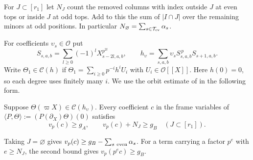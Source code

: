 For $J\subset[r_1]$ let $N_J$ count the removed columns with index
outside $J$ at even tops or inside $J$ at odd tops. Add to this
the sum of $|I\cap J|$ over the remaining minors at odd positions.
In particular $N_\varnothing=\sum_{s\in\mathcal T_{\rm ev}}\alpha_s$.

For coefficients $\upsilon_s\in\mathcal O$ put
\[
 S_{s,a,b}=\sum_{l\ge0}(-1)^l X_{s-2l,a,b}^{p^{2l}},\qquad
 h_\upsilon=\sum_{s,a,b}\upsilon_s S_{s,a,b}^{\,p}S_{s+1,a,b}.
\]
Write $\Theta_1\in\mathcal C(h)$ if
$\Theta_1=\sum_{i\ge0}p^{-i}h^i U_i$ with $U_i\in\mathcal O[[X]]$.
Here $h(0)=0$, so each degree uses finitely many $i$. We use the
orbit estimate of \citep[Theorem~9.6]{adriazola-grh} in the following form.

\begin{theorem}\label{thm:inert-valuation}
Suppose $\Theta(\varpi X)\in\mathcal C(h_\upsilon)$. Every coefficient
$c$ in the frame variables of $\langle P,\Theta\rangle
:=(P(\partial_X)\Theta)(0)$ satisfies
\begin{equation}\label{eq:inert-valuation}
       v_p(c)\ge g_A,\qquad v_p(c)+N_J\ge g_B
       \quad(J\subset[r_1]).
\end{equation}
\end{theorem}

Taking $J=\varnothing$ gives $v_p(c)\ge g_B-\sum_{s\ {\rm even}}\alpha_s$.
For a term carrying a factor $p^e$ with $e\ge N_J$, the second bound
gives $v_p(p^e c)\ge g_B$.

